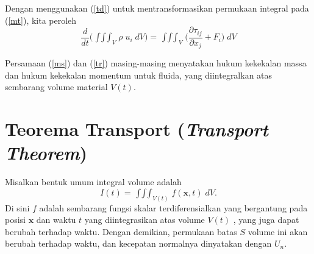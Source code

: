 \documentclass[12pt,a4paper]{report}
\begin{document}
Dengan menggunakan (\ref{td}) untuk mentransformasikan permukaan integral
pada (\ref{mt}), kita peroleh
\begin{equation}
\frac{d}{dt}\Bigg( \mathop{\int\int\int}_{V} \rho\; u_{i} \;dV \Bigg)= %
\mathop{\int\int\int}_{V} \Bigg(\frac{\partial \tau_{ij}}{\partial x_{j}}+
F_{i}\Bigg)\;dV  \label{tr}
\end{equation}

Persamaan (\ref{ms}) dan (\ref{tr}) masing-masing menyatakan hukum kekekalan
massa dan hukum kekekalan momentum untuk fluida, yang diintegralkan atas
sembarang volume material $V(t)$.

\section{Teorema Transport (\textit{Transport Theorem})}

Misalkan bentuk umum integral volume adalah
\begin{equation}
I(t)=\mathop{\int\int\int}_{V(t)} f(\mathbf{x},t)\; dV.
\end{equation}
Di sini $f$ adalah sembarang fungsi skalar terdiferensialkan yang bergantung
pada posisi $\mathbf{x}$ dan waktu $t$ yang diintegrasikan atas volume $V(t)$%
, yang juga dapat berubah terhadap waktu. Dengan demikian, permukaan batas $%
S $ volume ini akan berubah terhadap waktu, dan kecepatan normalnya
dinyatakan dengan $U_{n}.$
\end{document}
